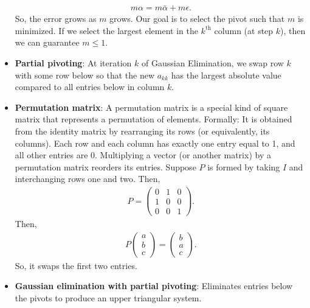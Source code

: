\documentclass{report}
\begin{document}
\begin{itemize}
            \begin{align*}
                m\alpha = m\bar{\alpha} + m\epsilon     
            .\end{align*}
            So, the error grows as $m$ grows. Our goal is to select the pivot such that $m$ is minimized.
            \bigbreak \noindent 
            If we select the largest element in the $k^{\text{th}}$ column (at step $k$), then we can guarantee $m \leq 1$.
        \item \textbf{Partial pivoting}: At iteration $k$ of Gaussian Elimination, we swap row $k$ with some row below so that the new $a_{kk}$ has the largest absolute value compared to all entries below in column $k$.
        \item \textbf{Permutation matrix}: A permutation matrix is a special kind of square matrix that represents a permutation of elements. Formally:
            It is obtained from the identity matrix by rearranging its rows (or equivalently, its columns).
            \bigbreak \noindent 
            Each row and each column has exactly one entry equal to 1, and all other entries are 0.
            \bigbreak \noindent 
            Multiplying a vector (or another matrix) by a permutation matrix reorders its entries.
            \bigbreak \noindent 
            Suppose $P$ is formed by taking $I$ and interchanging rows one and two. Then,
            \begin{align*}
                P = \begin{pmatrix} 0 & 1 & 0 \\ 1 & 0 & 0 \\ 0 & 0 & 1 \end{pmatrix}
            .\end{align*}
            Then, 
            \begin{align*}
                P\begin{pmatrix} a \\ b \\ c \end{pmatrix} = \begin{pmatrix} b \\ a \\ c \end{pmatrix}
            .\end{align*}
            So, it swaps the first two entries.
    \item \textbf{Gaussian elimination with partial pivoting}:
        Eliminates entries below the pivots to produce an upper triangular system.
        \bigbreak \noindent 

\end{itemize}
\end{document}
